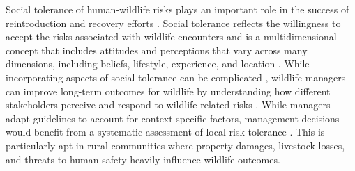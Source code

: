 \documentclass[english,12pt]{article}
\begin{document}
Social tolerance of human-wildlife risks plays an important role in the success of reintroduction and recovery efforts \citep{benson2023ecology}. Social tolerance reflects the willingness to accept the risks associated with wildlife encounters and is a multidimensional concept that includes attitudes and perceptions that vary across many dimensions, including beliefs, lifestyle, experience, and location \citep{brenner2020beyond}. While incorporating aspects of social tolerance can be complicated \citep{carlson_effect_2023}, wildlife managers can improve long-term outcomes for wildlife by understanding how different stakeholders perceive and respond to wildlife-related risks \citep{gore2012gendered}. While managers adapt guidelines to account for context-specific factors, management decisions would benefit from a systematic assessment of local risk tolerance \citep{bruskotter2014determining}. This is particularly apt in rural communities where property damages, livestock losses, and threats to human safety heavily influence wildlife outcomes.
\end{document}
